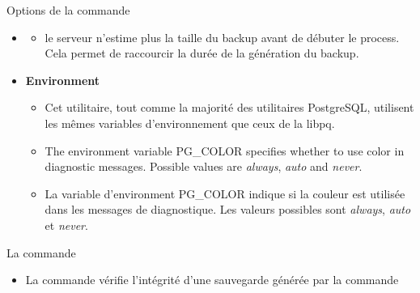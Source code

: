\begin{frame}{Options de la commande }

\begin{itemize}
   \item {}
   \begin{itemize}
      \item le serveur n'estime plus la taille du backup avant de débuter le process. Cela permet de raccourcir la durée de la génération du backup.
   \end{itemize}

\item{\textbf{Environment}}
   \begin{itemize}
      \item Cet utilitaire, tout comme la majorité des utilitaires PostgreSQL, utilisent les mêmes variables d'environnement que ceux de la libpq.
      \item The environment variable PG\_COLOR specifies whether to use color in diagnostic messages. Possible values are \textsl{always}, \textsl{auto} and \textsl{never}.
      \item La variable d'environment PG\_COLOR indique si la couleur est utilisée dans les messages de diagnostique. Les valeurs possibles sont \textsl{always}, \textsl{auto} et \textsl{never}.
   \end{itemize}
\end{itemize}

\end{frame}


\begin{frame}[fragile]{La commande }

\begin{itemize}

   \item La commande  vérifie l'intégrité d'une sauvegarde générée par la commande 

\end{itemize}

\begin{toile}
\end{toile}

\end{frame}

